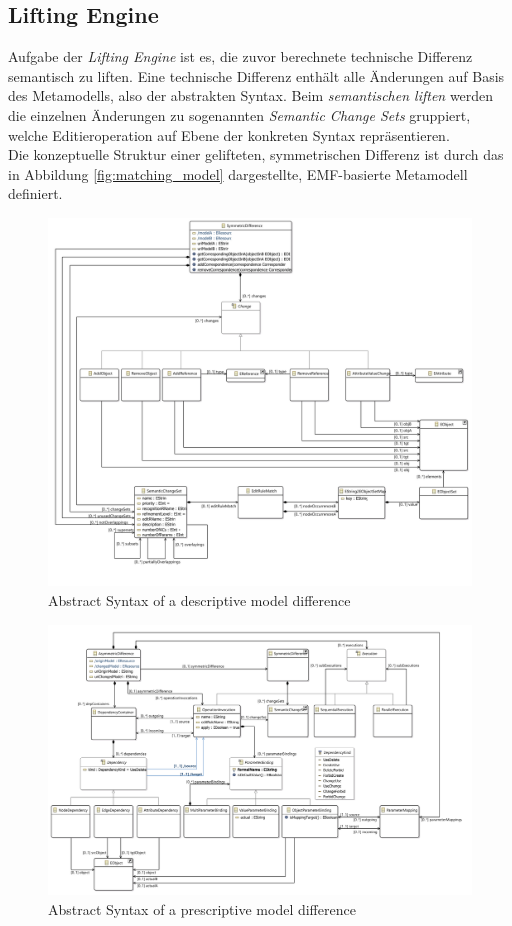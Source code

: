 \subsection{Lifting Engine}

Aufgabe der \textit{Lifting Engine} ist es, die zuvor berechnete technische Differenz semantisch zu liften.
Eine technische Differenz enthält alle Än\-der\-ung\-en  auf Basis des Metamodells, also der abstrakten Syntax.
Beim \textit{semantischen liften} werden die einzelnen Änderungen zu sogenannten \textit{Semantic Change Sets} gruppiert, welche Editieroperation auf Ebene der konkreten Syntax repräsentieren.\\
Die konzeptuelle Struktur einer gelifteten, symmetrischen Differenz ist durch das in Abbildung \ref{fig:matching_model} dargestellte, EMF-basierte Metamodell definiert. 

\begin{figure}[h!]
\centering
\includegraphics[width=\textwidth]{images/architecture/symmetric_model}
\caption{Abstract Syntax of a descriptive model difference}
\label{fig:symmetric_model}
\end{figure}


\begin{figure}[h!]
\centering
\includegraphics[width=\textwidth]{images/architecture/asymmetric_model}
\caption{Abstract Syntax of a prescriptive model difference}
\end{figure}

